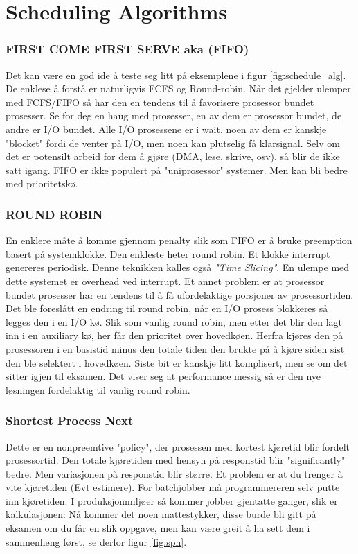 \section{Scheduling Algorithms}
\subsubsection{FIRST COME FIRST SERVE aka (FIFO)}
Det kan være en god ide å teste seg litt på eksemplene i figur \ref{fig:schedule_alg}. De enklese å forstå er naturligvis FCFS og Round-robin. Når det gjelder ulemper med FCFS/FIFO så har den en tendens til å favorisere prosessor bundet prosesser. Se for deg en haug med prosesser, en av dem er prosessor bundet, de andre er I/O bundet. Alle I/O prosessene er i wait, noen av dem er kanskje "blocket" fordi de venter på I/O, men noen kan plutselig få klarsignal. Selv om det er potensilt arbeid for dem å gjøre (DMA, lese, skrive, osv), så blir de ikke satt igang. FIFO er ikke populert på "uniprosessor" systemer. Men kan bli bedre med prioritetskø. 
\subsubsection{ROUND ROBIN}
En enklere måte å komme gjennom penalty slik som FIFO er å bruke preemption basert på systemklokke. Den enkleste heter round robin. Et klokke interrupt genereres periodisk. Denne teknikken kalles også \emph{"Time Slicing"}. En ulempe med dette systemet er overhead ved interrupt. Et annet problem er at prosessor bundet prosesser har en tendens til å få ufordelaktige porsjoner av prosessortiden. 
Det ble foreslått en endring til round robin, når en I/O prosess blokkeres så legges den i en I/O kø. Slik som vanlig round robin, men etter det blir den lagt inn i en auxiliary kø, her får den prioritet over hovedkøen. Herfra kjøres den på prosessoren i en basistid minus den totale tiden den brukte på å kjøre siden sist den ble selektert i hovedkøen. Siste bit er kanskje litt komplisert, men se om det sitter igjen til eksamen. Det viser seg at performance messig så er den nye løsningen fordelaktig til vanlig round robin.  
\subsubsection{Shortest Process Next}
Dette er en nonpreemtive "policy", der prosessen med kortest kjøretid blir fordelt prosessortid. Den totale kjøretiden med hensyn på responstid blir "significantly" bedre. Men variasjonen på responstid blir større. Et problem er at du trenger å vite kjøretiden (Evt estimere). For batchjobber må programmereren selv putte inn kjøretiden. I produksjonmiljøer så kommer jobber gjentatte ganger, slik er kalkulasjonen: Nå kommer det noen mattestykker, disse burde bli gitt på eksamen om du får en slik oppgave, men kan være greit å ha sett dem i sammenheng først, se derfor figur \ref{fig:spn}.

